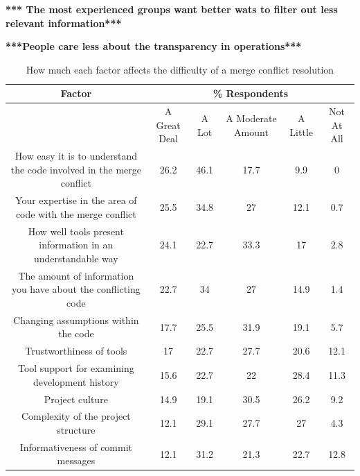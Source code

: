\documentclass[conference]{IEEEtran}
\begin{document}
\textbf{*** The most experienced groups want better wats to filter out less relevant information***}

\textbf{***People care less about the transparency in operations***}

\begin{table}[!t]
\renewcommand{\arraystretch}{1.3}
\caption{How much each factor affects the difficulty of a merge conflict resolution}
\label{percent_res_diff_table}
\centering
\begin{tabular}{c|c|c|c|c|c}
\hline
Factor & \multicolumn{5}{c}{ \% Respondents}\\
\hline
& A Great Deal & A Lot & A Moderate Amount & A Little & Not At All\\
\hline
How easy it is to understand the code involved in the merge conflict & 26.2 & 46.1 & 17.7 & 9.9 & 0\\
Your expertise in the area of code with the merge conflict & 25.5 & 34.8 & 27 & 12.1 & 0.7\\
How well tools present information in an understandable way & 24.1 & 22.7 & 33.3 & 17 & 2.8\\
The amount of information you have about the conflicting code & 22.7 & 34 & 27 & 14.9 & 1.4\\
Changing assumptions within the code & 17.7 & 25.5 & 31.9 & 19.1 & 5.7\\
Trustworthiness of tools & 17 & 22.7 & 27.7 & 20.6 & 12.1\\
Tool support for examining development history & 15.6 & 22.7 & 22 & 28.4 & 11.3\\
Project culture & 14.9 & 19.1 & 30.5 & 26.2 & 9.2\\
Complexity of the project structure & 12.1 & 29.1 & 27.7 & 27 & 4.3\\
Informativeness of commit messages & 12.1 & 31.2 & 21.3 & 22.7 & 12.8\\
\hline
\end{tabular}
\end{table}

%
%
\end{document}
